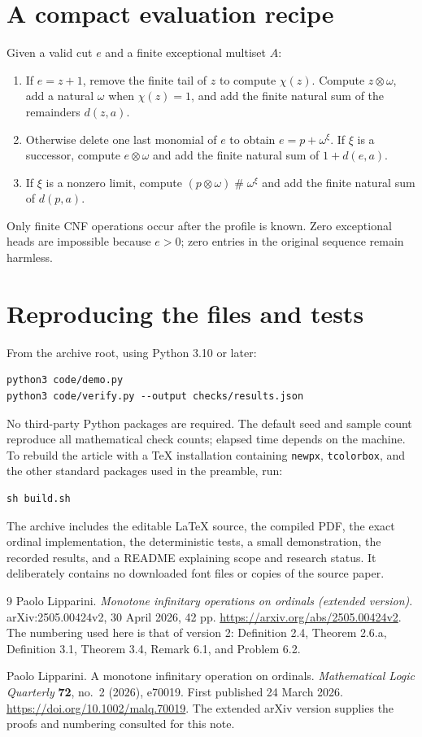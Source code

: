 \documentclass[11pt,a4paper]{article}
\theoremstyle{definition}
\newcommand{\ns}{\mathbin{\#}}
\newcommand{\nprod}{\mathbin{\otimes}}
\newcommand{\dd}[2]{d(#1,#2)}
\begin{document}
\section{A compact evaluation recipe}\label{app:recipe}
Given a valid cut $e$ and a finite exceptional multiset $A$:
\begin{enumerate}
\item If $e=z+1$, remove the finite tail of $z$ to compute $\chi(z)$.
      Compute $z\nprod\omega$, add a natural $\omega$ when $\chi(z)=1$,
      and add the finite natural sum of the remainders $\dd{z}{a}$.
\item Otherwise delete one last monomial of $e$ to obtain $e=p+\omega^\xi$.
      If $\xi$ is a successor, compute $e\nprod\omega$ and add the finite
      natural sum of $1+\dd{e}{a}$.
\item If $\xi$ is a nonzero limit, compute
      $(p\nprod\omega)\ns\omega^\xi$ and add the finite natural sum of
      $\dd{p}{a}$.
\end{enumerate}
Only finite CNF operations occur after the profile is known. Zero exceptional
heads are impossible because $e>0$; zero entries in the original sequence
remain harmless.

\section{Reproducing the files and tests}
From the archive root, using Python 3.10 or later:
\begin{lstlisting}
python3 code/demo.py
python3 code/verify.py --output checks/results.json
\end{lstlisting}
No third-party Python packages are required. The default seed and sample
count reproduce all mathematical check counts; elapsed time depends on the
machine. To rebuild the article with a TeX installation containing
\texttt{newpx}, \texttt{tcolorbox}, and the other standard packages used in
the preamble, run:
\begin{lstlisting}
sh build.sh
\end{lstlisting}
The archive includes the editable LaTeX source, the compiled PDF, the exact
ordinal implementation, the deterministic tests, a small demonstration,
the recorded results, and a README explaining scope and research status.
It deliberately contains no downloaded font files or copies of the source
paper.

\begin{thebibliography}{9}
Paolo Lipparini.
\newblock \emph{Monotone infinitary operations on ordinals (extended version)}.
\newblock arXiv:2505.00424v2, 30 April 2026, 42 pp.
\newblock \url{https://arxiv.org/abs/2505.00424v2}.
\newblock The numbering used here is that of version 2: Definition 2.4,
Theorem 2.6.a, Definition 3.1, Theorem 3.4, Remark 6.1, and Problem 6.2.

Paolo Lipparini.
\newblock A monotone infinitary operation on ordinals.
\newblock \emph{Mathematical Logic Quarterly} \textbf{72}, no.~2 (2026),
e70019. First published 24 March 2026.
\newblock \url{https://doi.org/10.1002/malq.70019}.
\newblock The extended arXiv version supplies the proofs and numbering
consulted for this note.
\end{thebibliography}
\end{document}
